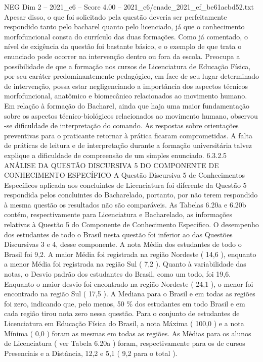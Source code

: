 \begin{textsample}{NEG Dim 2 – 2021\_c6 – Score 4.00 – 2021\_c6/enade\_2021\_ef\_be61acbd52.txt}
Apesar disso, o que foi solicitado pela questão deveria ser perfeitamente respondido tanto pelo bacharel quanto pelo licenciado, já que o conhecimento morfofuncional consta do currículo das duas formações.
Como já comentado, o nível de exigência da questão foi bastante básico, e o exemplo de que trata o enunciado pode ocorrer na intervenção dentro ou fora da escola.
Preocupa a possibilidade de que a formação nos cursos de Licenciatura de Educação Física, por seu caráter predominantemente pedagógico, em face de seu lugar determinado de intervenção, possa estar negligenciando a importância dos aspectos técnicos morfofuncional, anatômico e biomecânico relacionados ao movimento humano.
Em relação à formação do Bacharel, ainda que haja uma maior fundamentação sobre os aspectos técnico-biológicos relacionados ao movimento humano, observou -se dificuldade de interpretação do comando.
As respostas sobre orientações preventivas para o praticante retornar à prática ficaram comprometidas.
A falta de práticas de leitura e de interpretação durante a formação universitária talvez explique a dificuldade de compreensão de um simples enunciado. 6.3.2.5 ANÁLISE DA QUESTÃO DISCURSIVA 5 DO COMPONENTE DE CONHECIMENTO ESPECÍFICO A Questão Discursiva 5 de Conhecimentos Específicos aplicada aos concluintes de Licenciatura foi diferente da Questão 5 respondida pelos concluintes do Bacharelado, portanto, por não terem respondido à mesma questão os resultados não são comparáveis.
As Tabelas 6.20a e 6.20b contém, respectivamente para Licenciatura e Bacharelado, as informações relativas à Questão 5 do Componente de Conhecimento Específico.
O desempenho dos estudantes de todo o Brasil nesta questão foi inferior ao das Questões Discursivas 3 e 4, desse componente.
A nota Média dos estudantes de todo o Brasil foi 9,2.
A maior Média foi registrada na região Nordeste ( 14,6 ), enquanto a menor Média foi registrada na região Sul ( 7,2 ).
Quanto à variabilidade das notas, o Desvio padrão dos estudantes do Brasil, como um todo, foi 19,6.
Enquanto o maior desvio foi encontrado na região Nordeste ( 24,1 ), o menor foi encontrado na região Sul ( 17,5 ).
A Mediana para o Brasil e em todas as regiões foi zero, indicando que, pelo menos, 50 \% dos estudantes em todo Brasil e em cada região tirou nota zero nessa questão.
Para o conjunto de estudantes de Licenciatura em Educação Física do Brasil, a nota Máxima ( 100,0 ) e a nota Mínima ( 0,0 ) foram as mesmas em todas as regiões.
As Médias para os alunos de Licenciatura ( ver Tabela 6.20a ) foram, respectivamente para os de cursos Presenciais e a Distância, 12,2 e 5,1 ( 9,2 para o total ).

\end{textsample}
